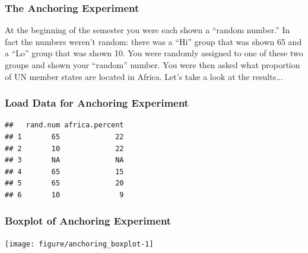\begin{frame}
\frametitle{The Anchoring Experiment}
At the beginning of the semester you were each shown a ``random number.'' In fact the numbers weren't random: there was a ``Hi'' group that was shown 65 and a ``Lo'' group that was shown 10. You were randomly assigned to one of these two groups and shown your ``random'' number. You were then asked what proportion of UN member states are located in Africa.  Let's take a look at the results...


\end{frame}
\begin{frame}[fragile]\frametitle{Load Data for Anchoring Experiment}
\footnotesize
\begin{knitrout}
\color{fgcolor}\begin{kframe}
\begin{alltt}
 \hlkwb{<-} 
 \hlkwb{<-} 
 \hlkwb{<-} \hlstd{survey[,}\hlstd{(}\hlstd{,} \hlstd{)]}
\end{alltt}
\begin{verbatim}
##   rand.num africa.percent
## 1       65             22
## 2       10             22
## 3       NA             NA
## 4       65             15
## 5       65             20
## 6       10              9
\end{verbatim}
\end{kframe}
\end{knitrout}

\end{frame}
\begin{frame}[t,fragile]\frametitle{Boxplot of Anchoring Experiment}
  \footnotesize
\begin{knitrout}
\color{fgcolor}\begin{kframe}
\begin{alltt}
 \hlopt{~}   
\end{alltt}
\end{kframe}

{\centering \texttt{[image: figure/anchoring\_boxplot-1]} 

}



\end{knitrout}
\end{frame}

